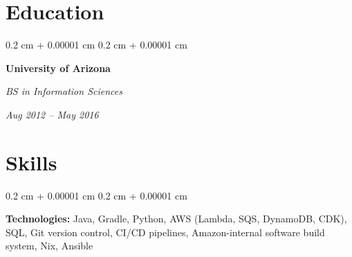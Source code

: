 \documentclass[10pt, letterpaper]{article}
\newenvironment{onecolentry}{
    \begin{adjustwidth}{
        0.2 cm + 0.00001 cm
    }{
        0.2 cm + 0.00001 cm
    }
}{
    \end{adjustwidth}
} %
\newenvironment{twocolentry}[2][]{
    \onecolentry
    \def\secondColumn{#2}
    \setcolumnwidth{\fill, 4.5 cm}
    \begin{paracol}{2}
}{
    \switchcolumn \raggedleft \secondColumn
    \end{paracol}
    \endonecolentry
} %
\begin{document}
    
    \section{Education}



        
        \begin{twocolentry}{
            
            
        \textit{Aug 2012 – May 2016}}
            \textbf{University of Arizona}

            \textit{BS in Information Sciences}
        \end{twocolentry}




    
    \section{Skills}



        
        \begin{onecolentry}
            \textbf{Technologies:} Java, Gradle, Python, AWS (Lambda, SQS, DynamoDB, CDK), SQL, Git version control, CI/CD pipelines, Amazon-internal software build system, Nix, Ansible
        \end{onecolentry}


    
\end{document}
